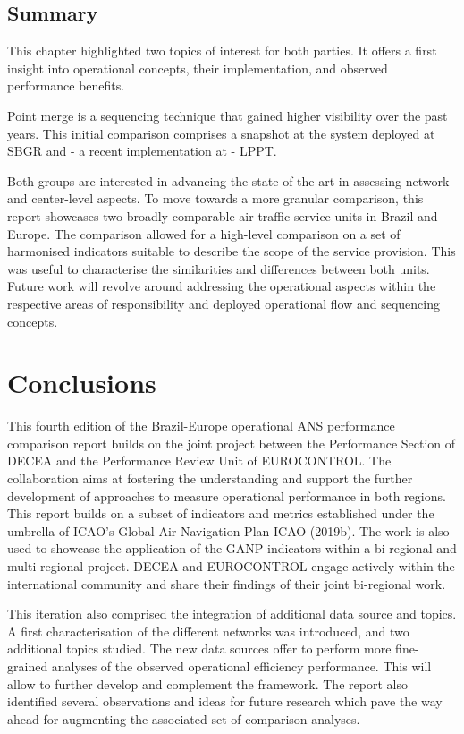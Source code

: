 \documentclass[
  a4paper,
  DIV=11,
  numbers=noendperiod]{scrreport}
\begin{document}
\section{Summary}\label{summary-5}

This chapter highlighted two topics of interest for both parties. It
offers a first insight into operational concepts, their implementation,
and observed performance benefits.

Point merge is a sequencing technique that gained higher visibility over
the past years. This initial comparison comprises a snapshot at the
system deployed at SBGR and - a recent implementation at - LPPT.

Both groups are interested in advancing the state-of-the-art in
assessing network- and center-level aspects. To move towards a more
granular comparison, this report showcases two broadly comparable air
traffic service units in Brazil and Europe. The comparison allowed for a
high-level comparison on a set of harmonised indicators suitable to
describe the scope of the service provision. This was useful to
characterise the similarities and differences between both units. Future
work will revolve around addressing the operational aspects within the
respective areas of responsibility and deployed operational flow and
sequencing concepts.


\chapter{Conclusions}\label{conclusions}

This fourth edition of the Brazil-Europe operational ANS performance
comparison report builds on the joint project between the Performance
Section of DECEA and the Performance Review Unit of EUROCONTROL. The
collaboration aims at fostering the understanding and support the
further development of approaches to measure operational performance in
both regions. This report builds on a subset of indicators and metrics
established under the umbrella of ICAO's Global Air Navigation Plan ICAO
(2019b). The work is also used to showcase the application of the GANP
indicators within a bi-regional and multi-regional project. DECEA and
EUROCONTROL engage actively within the international community and share
their findings of their joint bi-regional work.

This iteration also comprised the integration of additional data source
and topics. A first characterisation of the different networks was
introduced, and two additional topics studied. The new data sources
offer to perform more fine-grained analyses of the observed operational
efficiency performance. This will allow to further develop and
complement the framework. The report also identified several
observations and ideas for future research which pave the way ahead for
augmenting the associated set of comparison analyses.
\end{document}
